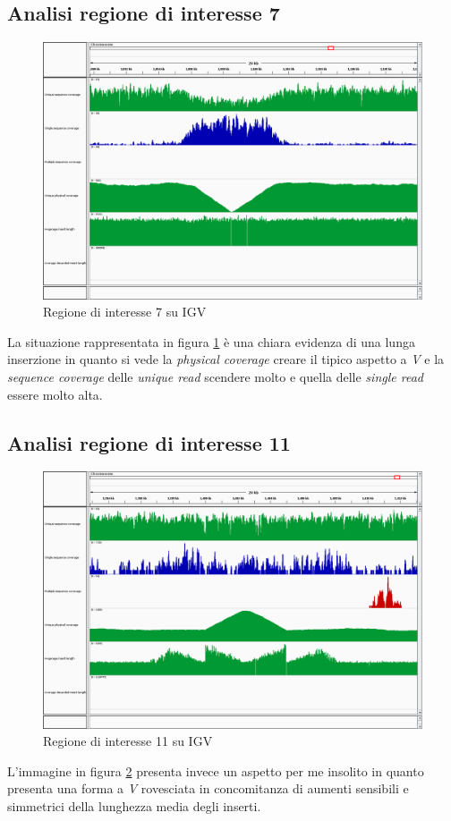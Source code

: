\subsection{Analisi regione di interesse 7}
\begin{figure}[htbp]
\centering
\includegraphics[width=.45\textwidth]{immagini/igv_regione7.png}
\caption{Regione di interesse 7 su IGV}
\label{fig:regione 7}
\end{figure}

La situazione rappresentata in figura \ref{fig:regione 7} è una chiara evidenza di una lunga inserzione in quanto si vede la \emph{physical coverage} creare il tipico aspetto a \emph{V} e la \emph{sequence coverage} delle \emph{unique read} scendere molto e quella delle \emph{single read} essere molto alta.

\subsection{Analisi regione di interesse 11}
\begin{figure}[htbp]
\centering
\includegraphics[width=.45\textwidth]{immagini/igv_regione11.png}
\caption{Regione di interesse 11 su IGV}
\label{fig:regioni 11}
\end{figure}

L'immagine in figura \ref{fig:regioni 11} presenta invece un aspetto per me insolito in quanto presenta una forma a \emph{V} rovesciata in concomitanza di aumenti sensibili e simmetrici della lunghezza media degli inserti.